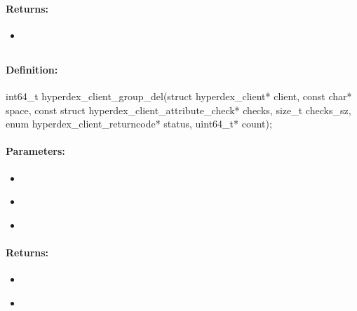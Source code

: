 \paragraph{Returns:}
\begin{itemize}[noitemsep]
\item {}\\

\end{itemize}

\pagebreak
\subsection{}
\label{api:c:group_del}


\paragraph{Definition:}
\begin{ccode}
int64_t hyperdex_client_group_del(struct hyperdex_client* client,
        const char* space,
        const struct hyperdex_client_attribute_check* checks, size_t checks_sz,
        enum hyperdex_client_returncode* status,
        uint64_t* count);
\end{ccode}

\paragraph{Parameters:}
\begin{itemize}[noitemsep]
\item {}\\

\item {}\\

\item {}\\

\end{itemize}

\paragraph{Returns:}
\begin{itemize}[noitemsep]
\item {}\\

\item {}\\

\end{itemize}

